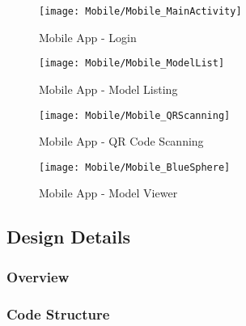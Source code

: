     \begin{figure}[H]
        \texttt{[image: Mobile/Mobile\_MainActivity]}
        \centering
        \caption{Mobile App - Login}
        \label{fig:mobileLoginActivity}
    \end{figure}

    \begin{figure}[H]
        \texttt{[image: Mobile/Mobile\_ModelList]}
        \centering
        \caption{Mobile App - Model Listing}
        \label{fig:mobileModelList}
    \end{figure}

    \begin{figure}[H]
        \texttt{[image: Mobile/Mobile\_QRScanning]}
        \centering
        \caption{Mobile App - QR Code Scanning}
        \label{fig:mobileQRScanning}
    \end{figure}

    \begin{figure}[H]
        \texttt{[image: Mobile/Mobile\_BlueSphere]}
        \centering
        \caption{Mobile App - Model Viewer}
        \label{fig:mobileModelViewer}
    \end{figure}

    \subsection{Design Details}

        \subsubsection{Overview}

        \subsubsection{Code Structure}


    